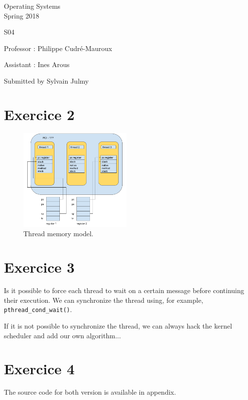 \documentclass[a4paper,11pt]{report}
\author{Sylvain Julmy}
\date{\today}
\begin{document}
\begin{center}
  \Large{
    Operating Systems\\
    Spring 2018
  }
  
  \noindent\makebox[\linewidth]{\rule{\linewidth}{0.4pt}}
  S04
  \noindent\makebox[\linewidth]{\rule{\linewidth}{0.4pt}}

  \begin{flushleft}
    Professor : Philippe Cudré-Mauroux

    Assistant : Ines Arous
  \end{flushleft}
  
  \noindent\makebox[\linewidth]{\rule{\linewidth}{0.4pt}}

  Submitted by Sylvain Julmy
  
  \noindent\makebox[\linewidth]{\rule{\textwidth}{1pt}}
\end{center}

\section*{Exercice 2}

\begin{figure}[ht]
  \centering
  \includegraphics[width=0.5\textwidth]{figures/OS_s04_ex2}
  \caption{\label{fig:label}Thread memory model.}
\end{figure}

\FloatBarrier

\section*{Exercice 3}

Is it possible to force each thread to wait on a certain message before
continuing their execution. We can synchronize the thread using, for example,
\verb+pthread_cond_wait()+.

If it is not possible to synchronize the thread, we can always hack the kernel
scheduler and add our own algorithm...

\section*{Exercice 4}

The source code for both version is available in appendix.
\end{document}
